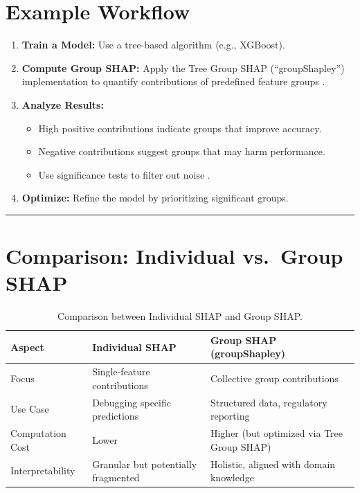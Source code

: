 \documentclass[11pt]{article}
\theoremstyle{remark}
\begin{document}
\section{Example Workflow}
\begin{enumerate}
  \item \textbf{Train a Model:} Use a tree-based algorithm (e.g., XGBoost).
  \item \textbf{Compute Group SHAP:} Apply the Tree Group SHAP (``groupShapley'') implementation to quantify contributions of predefined feature groups \cite{jullum2021groupShapley}.
  \item \textbf{Analyze Results:}
  \begin{itemize}
    \item High positive contributions indicate groups that improve accuracy.
    \item Negative contributions suggest groups that may harm performance.
    \item Use significance tests to filter out noise \cite{jullum2021groupShapley}.
  \end{itemize}
  \item \textbf{Optimize:} Refine the model by prioritizing significant groups.
\end{enumerate}

\bigskip
\hrule
\bigskip

\section{Comparison: Individual vs.\ Group SHAP}
\begin{table}[H]
  \centering\small
  \setlength{\tabcolsep}{5pt}
  \begin{tabular}{@{} l l l @{}}
    \toprule
    \textbf{Aspect}               & \textbf{Individual SHAP}                     & \textbf{Group SHAP (groupShapley)}                   \\
    \midrule
    Focus            & Single-feature contributions        & Collective group contributions            \\
    Use Case         & Debugging specific predictions      & Structured data, regulatory reporting     \\
    Computation Cost & Lower                               & Higher (but optimized via Tree Group SHAP) \\
    Interpretability & Granular but potentially fragmented & Holistic, aligned with domain knowledge   \\
    \bottomrule
  \end{tabular}
  \caption{Comparison between Individual SHAP and Group SHAP.}
  \label{tab:comparison}
\end{table}
\end{document}
